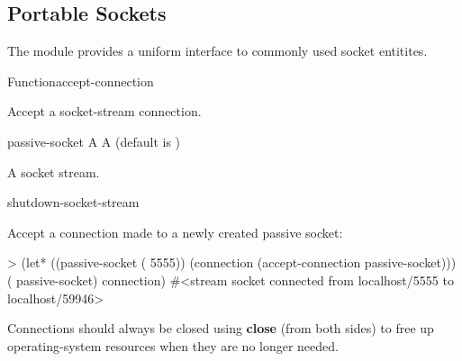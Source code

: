 \documentclass[10pt,twoside,english,pdftex]{article}
\begin{document}

\T\markright{}%
\T\pagestyle{plain}
\T\clearpage
\W{}
\T\pagestyle{fancy}
\T\thispagestyle{fancybottom}
\T\global\def\fnlastname{ }%
\subsection{Portable Sockets}
\label{sec:portablesockets}%

%
%
The  module provides a uniform interface to commonly
used socket entitites.

\W\entities
\T\clearpage


\begin{functiondoc}{Function}{accept-connection}{
     
    \returns{} } 
%
%
%

\fnsyntax

\fnpurpose Accept a socket-stream connection.

\fnpackage {}

\fnmodule {}

\fnargs
\begin{args}{passive-socket}
 A 
\arg[wait] A  (default is )
\end{args}

\fnreturns A socket stream.

\begin{alsos}{shutdown-socket-stream}
\end{alsos}

%
%
\fnexample
Accept a connection made to a newly created passive socket:
\begin{example}
> (let* ((passive-socket ( 5555))
         (connection (accept-connection passive-socket)))
     ( passive-socket)
     connection)
#<stream socket connected from localhost/5555 to localhost/59946>
\end{example}

\fnnote Connections should always be closed using \textbf{close}
(from both sides) to free up operating-system resources when they are
no longer needed.

\end{functiondoc}
\end{document}
